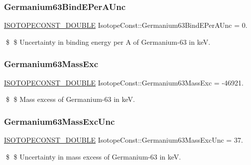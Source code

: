 \subsubsection{\texorpdfstring{Germanium63\+Bind\+E\+Per\+A\+Unc}{Germanium63BindEPerAUnc}}
{\footnotesize\ttfamily \mbox{\hyperlink{group___isotope_const-_macros_ga8f45a7272ce02c0b4c65c44636ed719a}{I\+S\+O\+T\+O\+P\+E\+C\+O\+N\+S\+T\+\_\+\+D\+O\+U\+B\+LE}} Isotope\+Const\+::\+Germanium63\+Bind\+E\+Per\+A\+Unc = 0.}

\$ \$ Uncertainty in binding energy per A of Germanium-\/63 in keV. \mbox{\label{group___isotope_const-_germanium-_ge63_ga8d404e4c70f7060628222bde23159717}} 
\subsubsection{\texorpdfstring{Germanium63\+Mass\+Exc}{Germanium63MassExc}}
{\footnotesize\ttfamily \mbox{\hyperlink{group___isotope_const-_macros_ga8f45a7272ce02c0b4c65c44636ed719a}{I\+S\+O\+T\+O\+P\+E\+C\+O\+N\+S\+T\+\_\+\+D\+O\+U\+B\+LE}} Isotope\+Const\+::\+Germanium63\+Mass\+Exc = -\/46921.}

\$ \$ Mass excess of Germanium-\/63 in keV. \mbox{\label{group___isotope_const-_germanium-_ge63_gadd295f1684f13edceb437cbd9bac2a1c}} 
\subsubsection{\texorpdfstring{Germanium63\+Mass\+Exc\+Unc}{Germanium63MassExcUnc}}
{\footnotesize\ttfamily \mbox{\hyperlink{group___isotope_const-_macros_ga8f45a7272ce02c0b4c65c44636ed719a}{I\+S\+O\+T\+O\+P\+E\+C\+O\+N\+S\+T\+\_\+\+D\+O\+U\+B\+LE}} Isotope\+Const\+::\+Germanium63\+Mass\+Exc\+Unc = 37.}

\$ \$ Uncertainty in mass excess of Germanium-\/63 in keV. \mbox{\label{group___isotope_const-_germanium-_ge63_ga6315f141d371d2ea604ee43edb05c72a}} 
